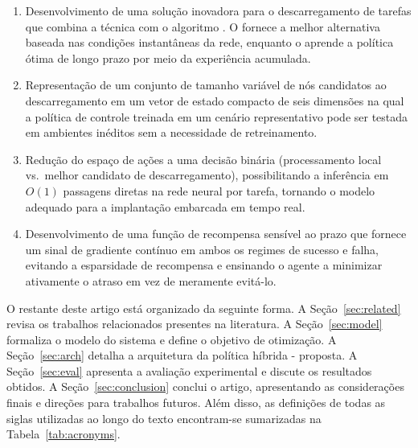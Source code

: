 \begin{enumerate}[leftmargin=*,nosep]
  \item Desenvolvimento de uma solução inovadora para o descarregamento de tarefas que combina a técnica  com o algoritmo . O  fornece a melhor alternativa baseada nas condições instantâneas da rede, enquanto o  aprende a política ótima de longo prazo por meio da experiência acumulada.
  \item Representação de um conjunto de tamanho variável de nós candidatos ao descarregamento em um vetor de estado compacto de seis dimensões na qual a política de controle treinada em um cenário representativo pode ser testada em ambientes inéditos sem a necessidade de retreinamento.
  \item Redução do espaço de ações a uma decisão binária (processamento local vs.\ melhor candidato de descarregamento), possibilitando a inferência em $O(1)$ passagens diretas na rede neural por tarefa, tornando o modelo adequado para a implantação embarcada em tempo real.
  \item Desenvolvimento de uma função de recompensa sensível ao prazo que fornece um sinal de gradiente contínuo em ambos os regimes de sucesso e falha, evitando a esparsidade de recompensa e ensinando o agente a minimizar ativamente o atraso em vez de meramente evitá-lo.
\end{enumerate}

O restante deste artigo está organizado da seguinte forma. A Seção~\ref{sec:related} revisa os trabalhos relacionados presentes na literatura. A Seção~\ref{sec:model} formaliza o modelo do sistema e define o objetivo de otimização. A Seção~\ref{sec:arch} detalha a arquitetura da política híbrida - proposta. A Seção~\ref{sec:eval} apresenta a avaliação experimental e discute os resultados obtidos. A Seção~\ref{sec:conclusion} conclui o artigo, apresentando as considerações finais e direções para trabalhos futuros. Além disso, as definições de todas as siglas utilizadas ao longo do texto encontram-se sumarizadas na Tabela~\ref{tab:acronyms}.

